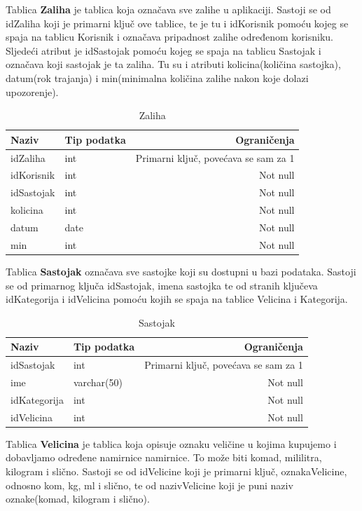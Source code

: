 \documentclass[diplomskirad]{fer}
\begin{document}
Tablica \textbf{Zaliha} je tablica koja označava sve zalihe u aplikaciji. Sastoji se od idZaliha koji je primarni ključ ove tablice, te je tu i idKorisnik pomoću kojeg se spaja na tablicu Korisnik i označava pripadnost zalihe određenom korisniku. Sljedeći atribut je idSastojak pomoću kojeg se spaja na tablicu Sastojak i označava koji sastojak je ta zaliha. Tu su i atributi kolicina(količina sastojka), datum(rok trajanja) i min(minimalna količina zalihe nakon koje dolazi upozorenje). 


\begin{table}[htb]
\label{tbl:Zaliha}
\centering
\renewcommand{\arraystretch}{1.3}
\begin{tabular}{llr} \hline
Naziv & Tip podatka & Ograničenja\\ \hline
idZaliha & int & Primarni ključ, povećava se sam za 1 \\
idKorisnik & int & Not null\\
idSastojak & int & Not null\\
kolicina & int & Not null\\
datum & date & Not null\\
min & int & Not null\\
\end{tabular}
\caption{Zaliha}
\end{table}

Tablica \textbf{Sastojak} označava sve sastojke koji su dostupni u bazi podataka. Sastoji se od primarnog ključa idSastojak, imena sastojka te od stranih ključeva idKategorija i idVelicina pomoću kojih se spaja na tablice Velicina i Kategorija. 


\begin{table}[H]
\label{tbl:Sastojak}
\centering

\begin{tabular}{llr} \hline
Naziv & Tip podatka & Ograničenja\\ \hline
idSastojak & int & Primarni ključ, povećava se sam za 1 \\
ime & varchar(50) & Not null\\
idKategorija & int & Not null\\
idVelicina & int & Not null\\
\end{tabular}
\caption{Sastojak}
\end{table}


Tablica \textbf{Velicina} je tablica koja opisuje oznaku veličine u kojima kupujemo i dobavljamo određene namirnice namirnice. To može biti komad, mililitra, kilogram i slično. Sastoji se od idVelicine koji je primarni ključ, oznakaVelicine, odnosno kom, kg, ml i slično, te od nazivVelicine koji je puni naziv oznake(komad, kilogram i slično).
\end{document}
